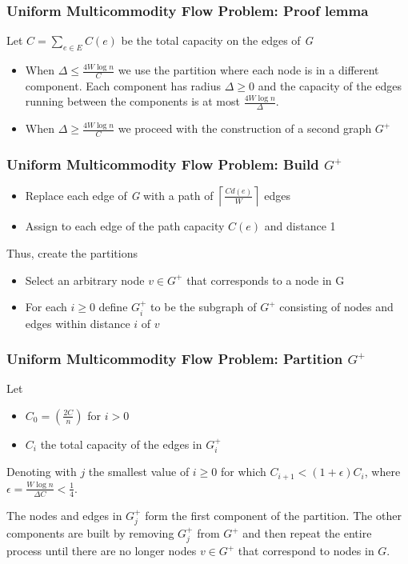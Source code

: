 \begin{frame}
\frametitle{Uniform Multicommodity Flow Problem: Proof lemma}

Let $C = \sum_{e \in E} C(e)$ be the total capacity on the edges of \emph{G}

\begin{itemize}
\item When $\Delta \leq \frac{4W\log n}{C}$ we use the partition where each node is in a different component. Each component has radius $\Delta \geq 0$ and the capacity of the edges running between the components is at most $\frac{4W\log n}{\Delta}$.

\item When $\Delta \geq \frac{4W\log n}{C}$ we proceed with the construction of a second graph $G^{+}$
\end{itemize}

\end{frame}

\begin{frame}
\frametitle{Uniform Multicommodity Flow Problem: Build $G^{+}$}

\begin{itemize}
\item Replace each edge of \emph{G} with a path of $\left \lceil \frac{Cd(e)}{W} \right \rceil$ edges
\item Assign to each edge of the path capacity $C(e)$ and distance 1
\end{itemize}

Thus, create the partitions

\begin{itemize}
\item Select an arbitrary node $v \in G^{+}$ that corresponds to a node in G
\item For each $i \geq 0$ define $G_i^{+}$ to be the subgraph of $G^{+}$ consisting of nodes and edges within distance $i$ of $v$
\end{itemize}
\end{frame}

\begin{frame}
\frametitle{Uniform Multicommodity Flow Problem: Partition $G^{+}$}

Let 
\begin{itemize}
\item $C_0 = \left ( \frac{2C}{n} \right )$ for $i>0$
\item $C_i$ the total capacity of the edges in $G_{i}^{+}$
\end{itemize}

Denoting with $j$ the smallest value of $i\geq 0$ for which $C_{i+1} < (1+\epsilon)C_i$, where $\epsilon = \frac{W \log n}{\Delta C}<\frac{1}{4}$.

The nodes and edges in $G_j^{+}$ form the first component of the partition. The other components are built by removing $G_j^{+}$ from $G^{+}$ and then repeat the entire process until there are no longer nodes $v \in G^{+}$ that correspond to nodes in $G$.

\end{frame}

